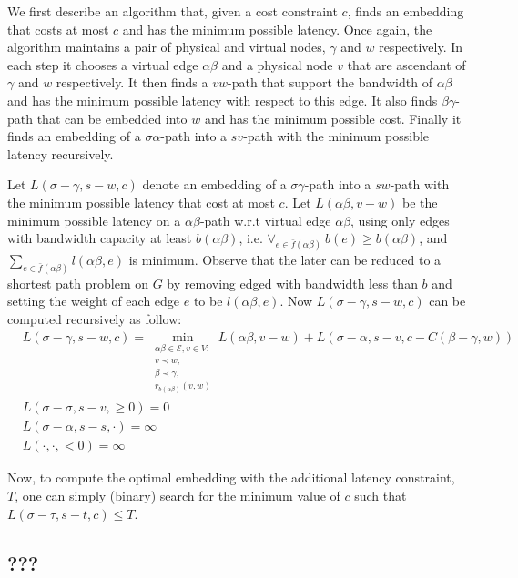 \documentclass[runningheads]{llncs}
\newcommand{\calE}{\mathcal{E}}
\begin{document}
We first describe an algorithm that, given a cost constraint $c$, 
finds an embedding that costs at most $c$ and has the minimum possible latency.
Once again, the algorithm maintains a pair of physical and virtual nodes,
$\gamma$ and $w$ respectively.
In each step it chooses a virtual edge $\alpha\beta$ and a physical node $v$
that are ascendant of $\gamma$ and $w$ respectively.
It then finds a $vw$-path that support the bandwidth of $\alpha\beta$ and
has the minimum possible latency with respect to this edge.
It also finds $\beta\gamma$-path that can be embedded into $w$ and has the 
minimum possible cost.
Finally it finds an embedding of a $\sigma\alpha$-path into a $sv$-path with 
the minimum possible latency recursively.

Let $L(\sigma-\gamma, s-w, c)$ denote an embedding of a $\sigma\gamma$-path
into a $sw$-path with the minimum possible latency that cost at most $c$.
Let $L(\alpha\beta, v-w)$ be the minimum possible latency on a $\alpha\beta$-path
w.r.t virtual edge $\alpha\beta$, using only edges with bandwidth capacity at
least $b(\alpha\beta)$, i.e. $\forall_{e \in \bar{f}(\alpha\beta)}~b(e) \geq
b(\alpha\beta)$, and $\sum_{e \in \bar{f}(\alpha\beta)}l(\alpha\beta, e)$ is
minimum.
Observe that the later can be reduced to a shortest path problem on $G$ by removing
edged with bandwidth less than $b$ and setting the weight of each edge $e$ to be 
$l(\alpha\beta, e)$.
Now $L(\sigma-\gamma, s-w, c)$ can be computed recursively as follow:
\begin{align*}
&L(\sigma-\gamma, s-w, c) = 
\min_{\substack{
\alpha\beta \in \calE,  
v \in V:
\\
v \prec w,
\\
\beta \prec \gamma, 
\\
r_{b(\alpha\beta)}(v,w)
}}
L(\alpha\beta, v-w) + 
L(\sigma-\alpha, s-v, c - C(\beta-\gamma, w))
\\
&L(\sigma-\sigma, s-v, \geq 0) = 0
\\
&L(\sigma-\alpha, s-s, \cdot) = \infty
\\
&L(\cdot, \cdot, <0) = \infty
\end{align*} 

Now, to compute the optimal embedding with the additional latency constraint,
$T$, one can simply (binary) search for the minimum value of $c$ such that
$L(\sigma-\tau, s-t, c) \leq T$.


\subsection{???}
\end{document}
